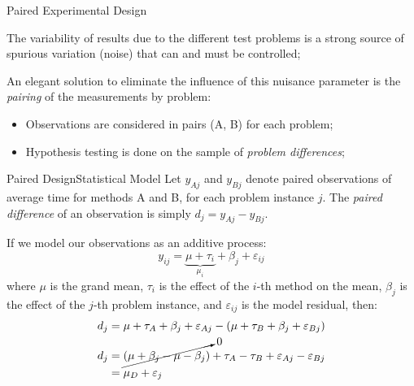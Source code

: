\begin{frame}{Paired Experimental Design}

  The variability of results due to the different test problems is a strong source of spurious variation (noise) that can and must be controlled;\bigskip

  An elegant solution to eliminate the influence of this nuisance parameter is the \textit{pairing} of the measurements by problem:\bigskip

  \begin{itemize}
  \item Observations are considered in pairs (A, B) for each problem;
  \item Hypothesis testing is done on the sample of \textit{problem differences};
  \end{itemize}
\end{frame}

\begin{frame}{Paired Design}{Statistical Model}
Let $y_{Aj}$ and $y_{Bj}$ denote paired observations of average time for methods A and B, for each problem instance $j$. The \textit{paired difference} of an observation is simply $d_j = y_{Aj} - y_{Bj}$.
\bigskip

If we model our observations as an additive process:
\begin{equation*}
y_{ij} = \underbrace{\mu + \tau_i}_{\mu_i} + \beta_j + \varepsilon_{ij}
\end{equation*}
\noindent where $\mu$ is the grand mean, $\tau_i$ is the effect of the $i$-th method on the mean, $\beta_j$ is the effect of the $j$-th problem instance, and $\varepsilon_{ij}$ is the model residual, then:
\begin{equation*}
\begin{split}
d_j &= \mu + \tau_A + \beta_j + \varepsilon_{Aj} - (\mu + \tau_B + \beta_j + \varepsilon_{Bj})\\
d_j &= \cancelto{0}{\left(\mu +\beta_j - \mu - \beta_j\right)} + \tau_A-\tau_B + \varepsilon_{Aj}-\varepsilon_{Bj}\\
&=\mu_{D} + \varepsilon_j\\
\end{split}
\end{equation*}

\end{frame}

